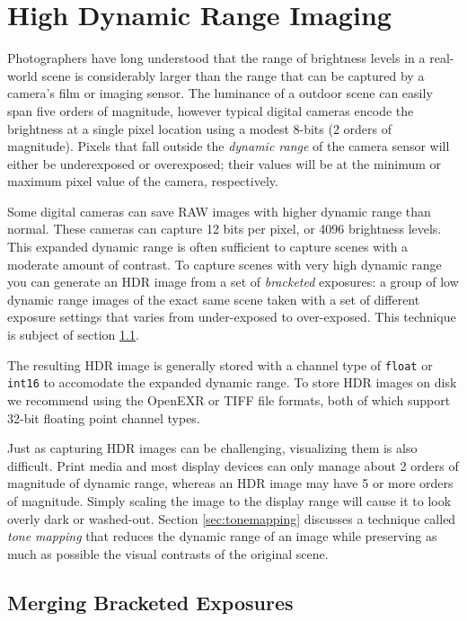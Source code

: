 \chapter{High Dynamic Range Imaging}\label{ch:hdr-imaging}

Photographers have long understood that the range of brightness levels in
a real-world scene is considerably larger than the range that can be
captured by a camera's film or imaging sensor.  The luminance of a
outdoor scene can easily span five orders of magnitude, however
typical digital cameras encode the brightness at a single pixel
location using a modest 8-bits (2 orders of magnitude).  Pixels that
fall outside the {\em dynamic range} of the camera sensor will either
be underexposed or overexposed; their values will be at the minimum or
maximum pixel value of the camera, respectively.

Some digital cameras can save RAW images with higher dynamic range
than normal.  These cameras can capture 12 bits per pixel, or 4096
brightness levels.  This expanded dynamic range is often sufficient to
capture scenes with a moderate amount of contrast. To capture scenes
with very high dynamic range you can generate an HDR image from a set
of {\em bracketed} exposures: a group of low dynamic range images of
the exact same scene taken with a set of different exposure settings
that varies from under-exposed to over-exposed.  This technique is
subject of section \ref{sec:hdr_merge}.

The resulting HDR image is generally stored with a channel type of
{\tt float} or {\tt int16} to accomodate the expanded dynamic range.
To store HDR images on disk we recommend using the OpenEXR or TIFF
file formats, both of which support 32-bit floating point channel
types.

Just as capturing HDR images can be challenging, visualizing them is
also difficult.  Print media and most display devices can only manage
about 2 orders of magnitude of dynamic range, whereas an HDR image may
have 5 or more orders of magnitude. Simply scaling the image to the
display range will cause it to look overly dark or washed-out. Section
\ref{sec:tonemapping} discusses a technique called {\em tone mapping}
that reduces the dynamic range of an image while preserving as much as
possible the visual contrasts of the original scene.

\section{Merging Bracketed Exposures}
\label{sec:hdr_merge}

